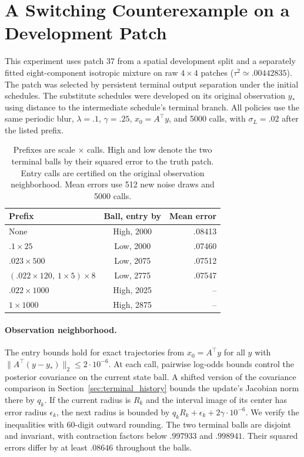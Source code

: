 \section{A Switching Counterexample on a Development Patch}
\label{sec:raw_patch_switching}

This experiment uses patch 37 from a spatial development split and a
separately fitted eight-component isotropic mixture on raw $4\times4$
patches ($\tau^2\simeq .00442835$). The patch was selected by persistent
terminal output separation under the initial schedules. The substitute
schedules were developed on its original observation $y_*$ using distance
to the intermediate schedule's terminal branch. All policies use
the same periodic blur, $\lambda=.1$, $\gamma=.25$, $x_0=A^\top y$,
and 5000 calls, with $\sigma_L=.02$ after the listed prefix.

\begin{table}[tb]
\centering
\small
\begin{tabular}{@{}lcr@{}}
\toprule
Prefix & Ball, entry by & Mean error\\
\midrule
None & High, 2000 & .08413\\
$.1\times25$ & Low, 2000 & .07460\\
$.023\times500$ & Low, 2075 & .07512\\
$(.022\times120,\ 1\times5)\times8$ & Low, 2775 & .07547\\
$.022\times1000$ & High, 2025 & --\\
$1\times1000$ & High, 2875 & --\\
\bottomrule
\end{tabular}
\caption{Prefixes are scale $\times$ calls. High and low denote
the two terminal balls by their squared error to the truth patch.
Entry calls are certified on the original observation neighborhood.
Mean errors use 512 new noise draws and 5000 calls.}
\label{tab:raw_patch_switching}
\end{table}

\paragraph{Observation neighborhood.}
The entry bounds hold for exact trajectories from $x_0=A^\top y$ for
all $y$ with $\|A^\top(y-y_*)\|_2\le 2\cdot10^{-6}$. At each call,
pairwise log-odds bounds control the posterior covariance on the
current state ball. A shifted version of the covariance comparison in
Section~\ref{sec:terminal_history} bounds the update's Jacobian norm
there by $q_k$. If the current radius is $R_k$ and the interval image
of its center has error radius $\epsilon_k$, the next radius is
bounded by $q_kR_k+\epsilon_k+2\gamma\cdot10^{-6}$. We verify the
inequalities with 60-digit outward rounding. The two terminal balls
are disjoint and invariant, with contraction factors below $.997933$
and $.998941$. Their squared errors differ by at least $.08646$
throughout the balls.

